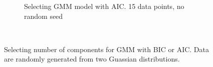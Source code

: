 \documentclass{article}
\begin{document}
\begin{figure}
\begin{subfigure}[h]{0.5\textwidth}
                    \caption{Selecting GMM model with AIC. 15 data points, no random seed}
                    \label{fig:GMMSelect15}
            \end{subfigure}
            ~ %
            \caption{Selecting number of components for GMM with BIC or AIC. Data are randomly generated from two Guassian distributions.}\label{fig:GMMSelect}
    \end{figure}
\end{document}
